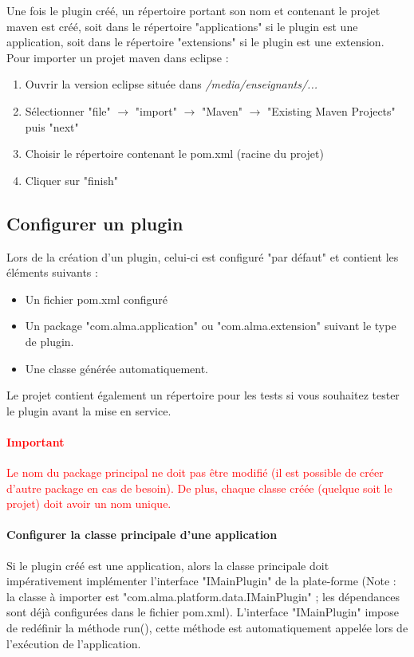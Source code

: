     Une fois le plugin créé, un répertoire portant son nom et contenant le projet maven est créé, soit dans le répertoire "applications" si le plugin est une application, soit dans le répertoire "extensions" si le plugin est une extension. Pour importer un projet maven dans eclipse :
    
    \begin{enumerate}
        \item Ouvrir la version eclipse située dans \textit{/media/enseignants/...}
        \item Sélectionner "file" $\rightarrow$ "import" $\rightarrow$ "Maven" $\rightarrow$ "Existing Maven Projects" puis "next"
        \item Choisir le répertoire contenant le pom.xml (racine du projet)
        \item Cliquer sur "finish"
    \end{enumerate}

\subsection{Configurer un plugin}

    Lors de la création d'un plugin, celui-ci est configuré "par défaut" et contient les éléments suivants : 
    
    \begin{itemize}
        \item Un fichier pom.xml configuré
        \item Un package "com.alma.application" ou "com.alma.extension" suivant le type de plugin.
        \item Une classe générée automatiquement.
    \end{itemize}
    
    Le projet contient également un répertoire pour les tests si vous souhaitez tester le plugin avant la mise en service.
    
    \paragraph{\textcolor{red}{Important}}
    \textcolor{red}{Le nom du package principal ne doit pas être modifié (il est possible de créer d'autre package en cas de besoin). De plus, chaque classe créée (quelque soit le projet) doit avoir un nom unique.}
    
    \paragraph{Configurer la classe principale d'une application} 
    Si le plugin créé est une application, alors la classe principale doit impérativement implémenter l'interface "IMainPlugin" de la plate-forme (Note : la classe à importer est "com.alma.platform.data.IMainPlugin" ; les dépendances sont déjà configurées dans le fichier pom.xml). L'interface "IMainPlugin" impose de redéfinir la méthode run(), cette méthode est automatiquement appelée lors de l'exécution de l'application.
    
